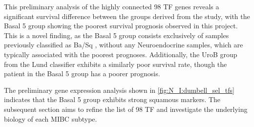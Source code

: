 This preliminary analysis of the highly connected 98 TF genes reveals a significant survival difference between the groups derived from the study, with the Basal 5 group showing the poorest survival prognosis observed in this project. This is a novel finding, as the Basal 5 group consists exclusively of samples previously classified as Ba/Sq \citep{Kamoun2020-tj,Robertson2017-mg}, without any Neuroendocrine samples, which are typically associated with the poorest prognoses. Additionally, the UroB group from the Lund classifier \citep{Marzouka2018-ge} exhibits a similarly poor survival rate, though the patient in the Basal 5 group has a poorer prognosis.

The preliminary gene expression analysis shown in \cref{fig:N_I:dumbell_sel_tfs} indicates that the Basal 5 group exhibits strong squamous markers. The subsequent section aims to refine the list of 98 TF and investigate the underlying biology of each MIBC subtype.




